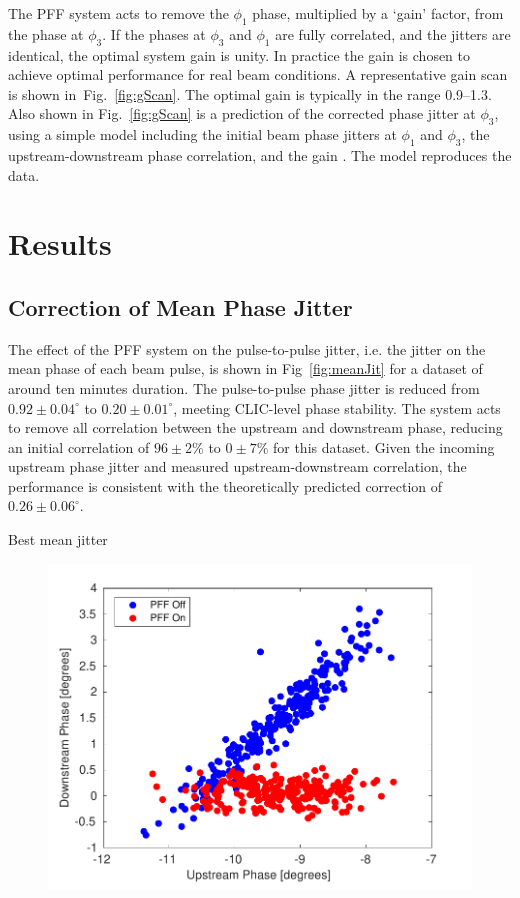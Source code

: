\documentclass[%
 reprint,
 superscriptaddress,
 amsmath,
 amssymb,
 prstab,
]{revtex4-1}
\begin{document}
The PFF system acts to remove the \(\phi_1\) phase, multiplied by a `gain' 
factor, from the phase at \(\phi_3\). If the phases at \(\phi_3\) and 
\(\phi_1\) are fully correlated, and the jitters are identical, the optimal 
system gain is unity.
In practice the gain is chosen to achieve optimal 
performance for real beam conditions. A representative gain scan is shown 
in~Fig.~\ref{fig:gScan}. The optimal gain is typically in the range 
0.9--1.3. Also shown in Fig.~\ref{fig:gScan} is a prediction of 
the corrected phase jitter at \(\phi_3\), using a simple model including the 
initial beam phase jitters at \(\phi_1\) and 
\(\phi_3\), the upstream-downstream phase correlation, and the gain 
\cite{RobertsThesis}. The model reproduces the data.

\section{\label{s:results}Results}

\subsection{\label{ss:meanJit}Correction of Mean Phase Jitter}

The effect of the PFF system on the pulse-to-pulse jitter, i.e. the jitter on 
the mean phase of each beam pulse, is shown in Fig~\ref{fig:meanJit} for a 
dataset of around ten minutes duration.
The pulse-to-pulse phase jitter is reduced from  \(0.92\pm0.04^\circ\) to 
\(0.20\pm0.01^\circ\), meeting CLIC-level phase stability. 
The system acts to remove all correlation between the upstream and 
downstream phase, reducing an initial correlation of \(96\pm2\%\) to 
\(0\pm7\%\) for this dataset.
Given the incoming upstream phase jitter and 
measured upstream-downstream correlation, the performance is consistent with 
the theoretically predicted correction of \(0.26\pm0.06^\circ\).

Best mean jitter

\begin{figure}
	\includegraphics[width=\columnwidth]{figs/res/bestUpDownScatter}%
	\caption{\label{f:bestUpDownScatter}
	}
\end{figure}
\end{document}
